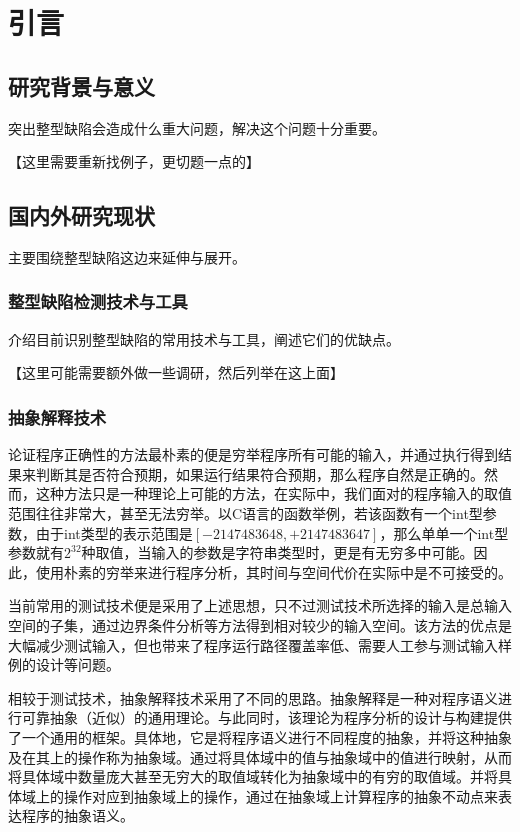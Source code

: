 
\chapter{引言}

 \section{研究背景与意义}
 
 突出整型缺陷会造成什么重大问题，解决这个问题十分重要。
 
 【这里需要重新找例子，更切题一点的】
 
 \section{国内外研究现状}
 
 主要围绕整型缺陷这边来延伸与展开。
 
 \subsection{整型缺陷检测技术与工具}
 
 介绍目前识别整型缺陷的常用技术与工具，阐述它们的优缺点。
 
 【这里可能需要额外做一些调研，然后列举在这上面】
 
 \subsection{抽象解释技术}
 
论证程序正确性的方法最朴素的便是穷举程序所有可能的输入，并通过执行得到结果来判断其是否符合预期，如果运行结果符合预期，那么程序自然是正确的。然而，这种方法只是一种理论上可能的方法，在实际中，我们面对的程序输入的取值范围往往非常大，甚至无法穷举。以C语言的函数举例，若该函数有一个int型参数，由于int类型的表示范围是$ \left[  -2147483648, +2147483647 \right] $，那么单单一个int型参数就有$ 2^{32}  $种取值，当输入的参数是字符串类型时，更是有无穷多中可能。因此，使用朴素的穷举来进行程序分析，其时间与空间代价在实际中是不可接受的。
 
 当前常用的测试技术便是采用了上述思想，只不过测试技术所选择的输入是总输入空间的子集，通过边界条件分析等方法得到相对较少的输入空间。该方法的优点是大幅减少测试输入，但也带来了程序运行路径覆盖率低、需要人工参与测试输入样例的设计等问题。
 
  相较于测试技术，抽象解释技术采用了不同的思路。抽象解释是一种对程序语义进行可靠抽象（近似）的通用理论\cite{cousot1977abstract}。与此同时，该理论为程序分析的设计与构建提供了一个通用的框架\cite{cousot1979systematic}。具体地，它是将程序语义进行不同程度的抽象，并将这种抽象及在其上的操作称为抽象域。通过将具体域中的值与抽象域中的值进行映射，从而将具体域中数量庞大甚至无穷大的取值域转化为抽象域中的有穷的取值域。并将具体域上的操作对应到抽象域上的操作，通过在抽象域上计算程序的抽象不动点来表达程序的抽象语义。
 
